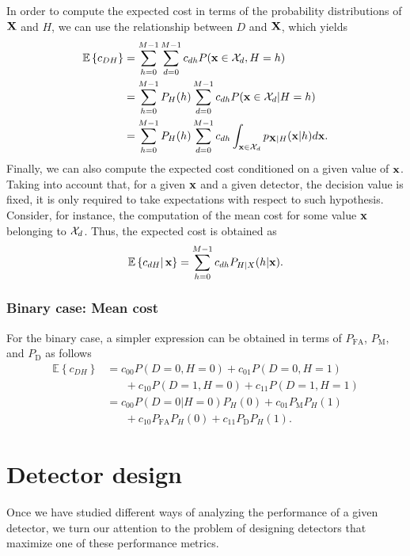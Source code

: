 In order to compute the expected cost in terms of the probability distributions of ${\bf X}$ and $H$, we can use the relationship between $D$ and ${\bf X}$, which yields
\begin{align}
\mathbb{E}\left\{ c_{DH}\right\} & = \sum_{h=0}^{M-1} \sum_{d=0}^{M-1} c_{dh} P({\bf x}\in {\cal X}_d, H=h) \nonumber \\
& = \sum_{h=0}^{M-1} P_H(h) \sum_{d=0}^{M-1} c_{dh} P({\bf x}\in {\cal X}_d| H=h) \nonumber \\
& = \sum_{h=0}^{M-1} P_H(h) \sum_{d=0}^{M-1} c_{dh} \int_{{\bf x}\in {\cal X}_d} p_{{\bf X}|H}({\bf x}|h) d{\bf x}.\nonumber
\end{align}
Finally, we can also compute the expected cost conditioned on a given value of ${\bf x}$. Taking into account that, for a given ${\bf x}$ and a given detector, the decision value is fixed, it is only required to take expectations with respect to such hypothesis. Consider, for instance, the computation of the mean cost for some value ${\bf x}$ belonging to ${\cal X}_d$. Thus, the expected cost is obtained as
\begin{equation}
    \mathbb{E}\left\{ c_{dH}\right|{\bf x}\} = \sum_{h=0}^{M-1} c_{dh} P_{H|X}(h|{\bf x}).
\label{eq:cost_x}
\end{equation}

\subsubsection{Binary case: Mean cost}

For the binary case, a simpler expression can be obtained in terms of $P_\text{FA}$, $P_\text{M},$ and $P_\text{D}$ as follows
\begin{align}
    \mathbb{E}\left\{ c_{DH}\right\} & = c_{00} P(D=0, H=0) + c_{01} P(D=0,H=1) \nonumber \\
    & \;\;\;\;\;\; + c_{10} P(D=1, H=0) + c_{11} P(D=1,H=1) \nonumber \\
    & = c_{00} P(D=0|H=0) P_H(0) + c_{01} P_\text{M} P_H(1) \nonumber \\
    & \;\;\;\;\;\; + c_{10} P_\text{FA}P_H(0) + c_{11} P_\text{D} P_H(1) .\nonumber
\end{align}

\section{Detector design}
\label{subsec:design}

Once we have studied different ways of analyzing the performance of a given detector, we turn our attention to the problem of designing detectors that maximize one of these performance metrics.

